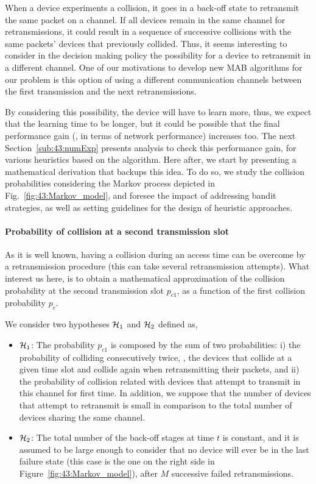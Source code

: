 When a device experiments a collision, it goes in a back-off state to retransmit the same packet on a channel.
If all devices remain in the same channel for retransmissions, it could result in a sequence of successive collisions with the same packets' devices that previously collided.
%
Thus, it seems interesting to consider in the decision making policy the possibility for a device to retransmit in a different channel.
One of our motivations to develop new MAB algorithms for our problem is this option of using a different communication channels between the first transmission and the next retransmissions.

By considering this possibility, the device will have to learn more, thus, we expect that the learning time to be longer, but it could be possible that the final performance gain (\ie, in terms of network performance) increases too.
The next Section~\ref{sub:43:numExp} presents analysis to check this performance gain, for various heuristics based on the \UCB{} algorithm.
%
Here after, we start by presenting a mathematical derivation that backups this idea.
To do so, we study the collision probabilities considering the Markov process depicted in Fig.~\ref{fig:43:Markov_model}, and foresee the impact of addressing bandit strategies, as well as setting guidelines for the design of heuristic approaches.


\paragraph{Probability of collision at a second transmission slot}

As it is well known, having a collision during an access time can be overcome by a retransmission procedure (this can take several retransmission attempts).
What interest us here, is to obtain a mathematical approximation of the collision probability at the second transmission slot $p_{c1}$, as a function of the first collision probability $p_{c}$.

We consider two hypotheses $\mathcal{H}_{1}$ and $\mathcal{H}_{2}$ defined as,
\begin{itemize}
	\item $\mathcal{H}_{1}$:
    The probability $p_{c1}$ is composed by the sum of two probabilities: i)
    the probability of colliding consecutively twice, \ie, the devices that collide at a given time slot and collide again when retransmitting their packets,
    and ii) the probability of collision related with devices that attempt to transmit in this channel for first time.
    In addition, we suppose that the number of devices that attempt to retransmit is small in comparison to the total number of devices sharing the same channel.

	\item $\mathcal{H}_{2}$:
	The total number of the back-off stages at time $t$ is constant, and it is assumed to be large enough to consider that no device will ever be in the last failure state (this case is the one on the right side in Figure~\ref{fig:43:Markov_model}), after $M$ successive failed retransmissions.
\end{itemize}

